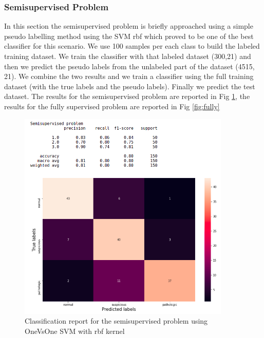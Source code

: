 \documentclass[a4paper,12pt]{article}
\begin{document}
\subsubsection{Semisupervised Problem}
In this section the semisupervised problem is briefly approached using a simple pseudo labelling method using the SVM rbf which proved to be one of the best classifier for this scenario. We use 100 samples per each class to build the labeled training dataset. We train the classifier with that labeled dataset (300,21) and then we predict the pseudo labels from the unlabeled part of the dataset (4515, 21). We combine the two results and we train a classifier using the full training dataset (with the true labels and the pseudo labels). Finally we predict the test dataset. The results for the semisupervised problem are reported in Fig \ref{fig:semi}, the results for the fully supervised problem are reported in Fig \ref{fig:fully}  

\begin{figure}[H]
  \begin{center}
  \includegraphics[width=0.9\textwidth]{images/semi.png}
  \end{center}
  \caption{Classification report for the semisupervised problem using OneVsOne SVM with rbf kernel}
  \label{fig:semi}
\end{figure}
\end{document}
